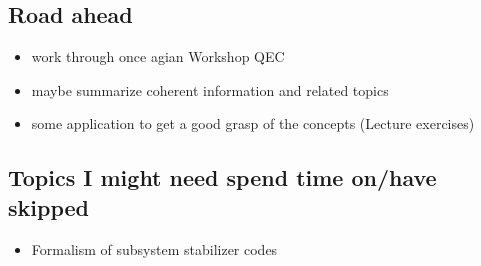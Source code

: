 \subsection{Road ahead}
\begin{itemize}
    \item work through once agian Workshop QEC  
    \item maybe summarize coherent information and related topics
    \item some application to get a good grasp of the concepts (Lecture exercises)
\end{itemize}

\subsection{Topics I might need spend time on/have skipped}
\begin{itemize}
    \item Formalism of subsystem stabilizer codes
\end{itemize}